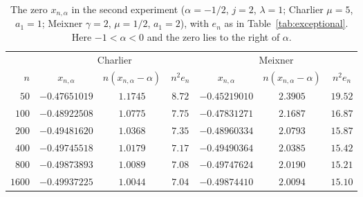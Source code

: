 \begin{table}[!htbp]
\centering
\small
\caption{The zero $x_{n,\alpha}$ in the second experiment ($\alpha=-1/2$, $j=2$, $\lambda=1$; Charlier $\mu=5$, $a_1=1$; Meixner $\gamma=2$, $\mu=1/2$, $a_1=2$), with $e_n$ as in Table~\ref{tab:exceptional}. Here $-1<\alpha<0$ and the zero lies to the right of $\alpha$.}
\label{tab:half}
\renewcommand{\arraystretch}{1.15}
\begin{tabular}{rcccccc}
\toprule
& \multicolumn{3}{c}{Charlier} & \multicolumn{3}{c}{Meixner}\\
\cmidrule(lr){2-4}\cmidrule(lr){5-7}
$n$ & $x_{n,\alpha}$ & $n(x_{n,\alpha}-\alpha)$ & $n^{2}e_n$ & $x_{n,\alpha}$ & $n(x_{n,\alpha}-\alpha)$ & $n^{2}e_n$\\
\midrule
$50$ & $-0.47651019$ & $1.1745$ & $8.72$ & $-0.45219010$ & $2.3905$ & $19.52$\\
$100$ & $-0.48922508$ & $1.0775$ & $7.75$ & $-0.47831271$ & $2.1687$ & $16.87$\\
$200$ & $-0.49481620$ & $1.0368$ & $7.35$ & $-0.48960334$ & $2.0793$ & $15.87$\\
$400$ & $-0.49745518$ & $1.0179$ & $7.17$ & $-0.49490364$ & $2.0385$ & $15.42$\\
$800$ & $-0.49873893$ & $1.0089$ & $7.08$ & $-0.49747624$ & $2.0190$ & $15.21$\\
$1600$ & $-0.49937225$ & $1.0044$ & $7.04$ & $-0.49874410$ & $2.0094$ & $15.10$\\
\bottomrule
\end{tabular}
\end{table}
